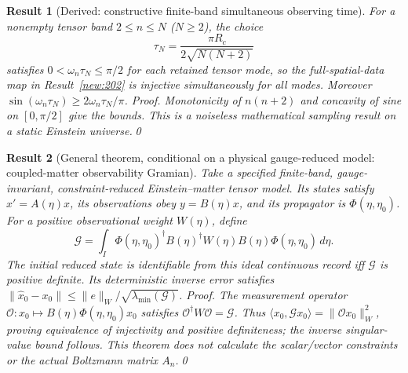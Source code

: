\documentclass[aps,prd,onecolumn,notitlepage,groupedaddress,11pt]{revtex4-2}
\newtheorem{result}{Result}
\begin{document}
\begin{result}[\textsf{Derived}: constructive finite-band simultaneous observing time]\label{new:203}
For a nonempty tensor band $2\le n\le N$ ($N\ge2$), the choice
\begin{equation}\label{eq:tt-good-tau}
 \tau_N=\frac{\pi R_c}{2\sqrt{N(N+2)}}
\end{equation}
satisfies $0<\omega_n\tau_N\le\pi/2$ for each retained tensor mode, so the full-spatial-data map in Result~\ref{new:202} is injective simultaneously for all modes. Moreover $\sin(\omega_n\tau_N)\ge 2\omega_n\tau_N/\pi$. \textit{Proof.} Monotonicity of $n(n+2)$ and concavity of sine on $[0,\pi/2]$ give the bounds. This is a noiseless mathematical sampling result on a static Einstein universe.\qed
\end{result}

\begin{result}[\textsf{General theorem, conditional on a physical gauge-reduced model}: coupled-matter observability Gramian]\label{new:204}
Take a specified finite-band, gauge-invariant, constraint-reduced Einstein--matter tensor model. Its states satisfy $x'=A(\eta)x$, its observations obey $y=B(\eta)x$, and its propagator is $\Phi(\eta,\eta_0)$. For a positive observational weight $W(\eta)$, define
\begin{equation}\label{eq:tt-gramian}
 \mathcal G=\int_I \Phi(\eta,\eta_0)^\dagger B(\eta)^\dagger W(\eta)B(\eta)\Phi(\eta,\eta_0)\,d\eta.
\end{equation}
The initial \emph{reduced} state is identifiable from this ideal continuous record iff $\mathcal G$ is positive definite. Its deterministic inverse error satisfies $\|\widehat x_0-x_0\|\le\|e\|_W/\sqrt{\lambda_{\min}(\mathcal G)}$. \textit{Proof.} The measurement operator $\mathcal O:x_0\mapsto B(\eta)\Phi(\eta,\eta_0)x_0$ satisfies $\mathcal O^\dagger W\mathcal O=\mathcal G$. Thus $\langle x_0,\mathcal Gx_0\rangle=\|\mathcal O x_0\|_W^2$, proving equivalence of injectivity and positive definiteness; the inverse singular-value bound follows. This theorem does not calculate the scalar/vector constraints or the actual Boltzmann matrix $A_n$.\qed
\end{result}
\end{document}
